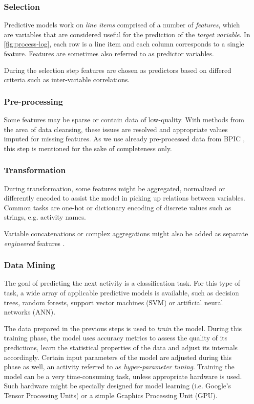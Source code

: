\subsubsection*{Selection}
Predictive models work on \textit{line items} comprised of a number of \textit{features}, which are variables that are considered useful for the prediction of the \textit{target variable}. In \autoref{fig:process-log}, each row is a line item and each column corresponds to a single feature. Features are sometimes also referred to as predictor variables.

During the selection step features are chosen as predictors based on differed criteria such as inter-variable correlations.

\subsubsection*{Pre-processing}
Some features may be sparse or contain data of low-quality. With methods from the area of data cleansing, these issues are resolved and appropriate values imputed for missing features. As we use already pre-processed data from BPIC \cite{BPIC2011, BPIC2012, BPIC2017}, this step is mentioned for the sake of completeness only.

\subsubsection*{Transformation}
\label{sec:predictive-model-development:transformation}
During transformation, some features might be aggregated, normalized or differently encoded to assist the model in picking up relations between variables. Common tasks are one-hot or dictionary encoding of discrete values such as strings, e.g. activity names.

Variable concatenations or complex aggregations might also be added as separate \textit{engineered} features \cite{schoenig2018}.

\subsubsection*{Data Mining}
The goal of predicting the next activity is a classification task. For this type of task, a wide array of applicable predictive models is available, such as decision trees, random forests, support vector machines (SVM) or artificial neural networks (ANN).

The data prepared in the previous steps is used to \textit{train} the model. During this training phase, the model uses accuracy metrics to assess the quality of its predictions, learn the statistical properties of the data and adjust its internals accordingly. Certain input parameters of the model are adjusted during this phase as well, an activity referred to as \textit{hyper-parameter tuning}. Training the model can be a very time-consuming task, unless appropriate hardware is used. Such hardware might be specially designed for model learning (i.e. Google's Tensor Processing Units) or a simple Graphics Processing Unit (GPU).

